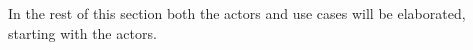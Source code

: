 In the rest of this section both the actors and use cases will be elaborated, starting with the actors.







